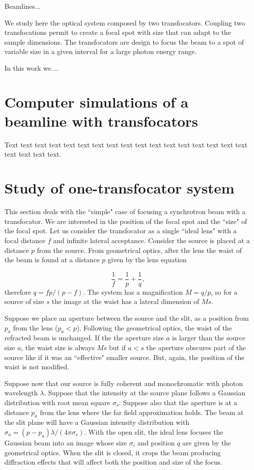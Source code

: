 \documentclass{iucr}              %
\begin{document}
Beamlines...

We study here the optical system composed by two transfocators. Coupling two transfocations permit to create a focal spot with size that can adapt to the sample dimensions. The transfocators are design to focus the beam to a spot of variable size in a given interval for a large photon energy range. 

In this work we....

\section{Computer simulations of a beamline with transfocators}

Text text text text text text text text text text text text text text
text text text text text text text.

\section{Study of one-transfocator system}

This section deals with the ``simple" case of focusing a synchrotron beam with a transfocator. We are interested in the position of the focal spot and the ``size" of the focal spot. Let us consider the transfocator as a single ``ideal lens" with a focal distance $f$ and infinite lateral acceptance. Consider the source is placed at a distance $p$ from the source. From geometrical optics, after the lens the waist of the beam is found at a distance $p$ given by the lens equation

\begin{equation}
    \label{eq:lens}
    \frac{1}{f} = \frac{1}{p} + \frac{1}{q},
\end{equation}
therefore $q=f p / (p-f)$. The system has a magnification $M=q/p$, so for a source of size $s$ the image at the waist has a lateral dimension of $Ms$. 

Suppose we place an aperture between the source and the slit, as a position from $p_a$ from the lens ($p_a < p$). Following the geometrical optics, the waist of the refracted beam is unchanged. If the the aperture size $a$ is larger than the source size $a$, the waist size is always $Ms$ but if $a<s$ the aperture obscures part of the source like if it was an ``effective" smaller source. But, again, the position of the waist is not modified. 

Suppose now that our source is fully coherent and monochromatic with photon wavelength $\lambda$. Suppose that the intensity at the source plane follows a Gaussian distribution with root mean square $\sigma_s$. Suppose also that the aperture is at a distance $p_a$ from the lens where the far field approximation holds. The beam at the slit plane will have a Gaussian intensity distribution with $\sigma_a=(p-p_a) \lambda /(4 \pi  \sigma_s)$. With the open slit, the ideal lens focuses the Gaussian beam into an image whose size $\sigma_i$ and position $q$ are given by the geometrical optics. When the slit is closed, it crops the beam producing diffraction effects that will affect both the position and size of the focus. 
\end{document}
